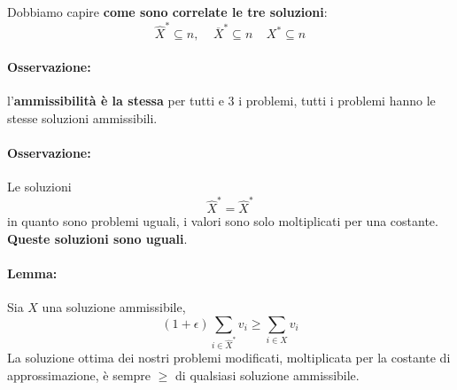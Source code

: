 \newpage

Dobbiamo capire \textbf{come sono correlate le tre soluzioni}:
$$ \hat X^\ast \subseteq n, \;\;\;\; \overline X^\ast \subseteq n \;\;\;\; X^\ast \subseteq n$$

\paragraph{Osservazione:} l'\textbf{ammissibilità è la stessa} per tutti e 3 i problemi, tutti i problemi hanno le stesse soluzioni ammissibili.\\

\paragraph{Osservazione:} Le soluzioni 
$$ \hat X^\ast = \hat X^\ast$$
in quanto sono problemi uguali, i valori sono solo moltiplicati per una costante. \textbf{Queste soluzioni sono uguali}.\\

\paragraph{Lemma:} Sia $X$ una soluzione ammissibile, 
$$ (1 + \epsilon) \sum_{i \in \hat X^\ast} v_i \geq \sum_{i \in X} v_i $$
La soluzione ottima dei nostri problemi modificati, moltiplicata per la costante di approssimazione, è sempre $\geq$ di qualsiasi soluzione ammissibile.\\

